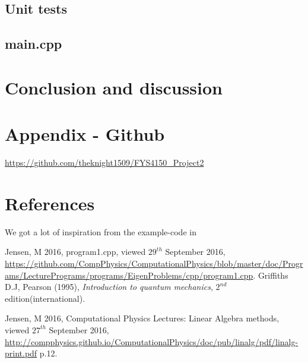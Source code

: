 \documentclass[11pt,a4paper,notitlepage]{article}
\begin{document}
\subsection{Unit tests}
\subsection{main.cpp}
\section{Conclusion and discussion}
\section{Appendix - Github} \label{section:github}
\url{https://github.com/theknight1509/FYS4150_Project2}
\section{References}
We got a lot of inspiration from the example-code in \cite[web-site]{example_code}

\begin{thebibliography}{9}

  Jensen, M 2016,
  program1.cpp,
  viewed $29^{th}$ September 2016,
  \url{https://github.com/CompPhysics/ComputationalPhysics/blob/master/doc/Programs/LecturePrograms/programs/EigenProblems/cpp/program1.cpp}.
  Griffiths D.J, 
  Pearson (1995),
  \emph{Introduction to quantum mechanics},
  $2^{nd}$ edition(international).
  
	Jensen, M 2016, 
	Computational Physics Lectures: Linear
Algebra methods, 
	viewed $27^{th}$ September 2016, 
	\url{http://compphysics.github.io/ComputationalPhysics/doc/pub/linalg/pdf/linalg-print.pdf} p.12. 

\end{thebibliography}
\end{document}
